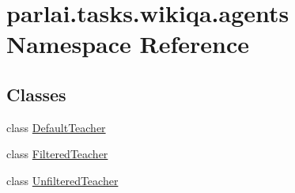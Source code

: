 \hypertarget{namespaceparlai_1_1tasks_1_1wikiqa_1_1agents}{}\section{parlai.\+tasks.\+wikiqa.\+agents Namespace Reference}
\label{namespaceparlai_1_1tasks_1_1wikiqa_1_1agents}
\subsection*{Classes}
\begin{DoxyCompactItemize}
\item 
class \hyperlink{classparlai_1_1tasks_1_1wikiqa_1_1agents_1_1DefaultTeacher}{Default\+Teacher}
\item 
class \hyperlink{classparlai_1_1tasks_1_1wikiqa_1_1agents_1_1FilteredTeacher}{Filtered\+Teacher}
\item 
class \hyperlink{classparlai_1_1tasks_1_1wikiqa_1_1agents_1_1UnfilteredTeacher}{Unfiltered\+Teacher}
\end{DoxyCompactItemize}
